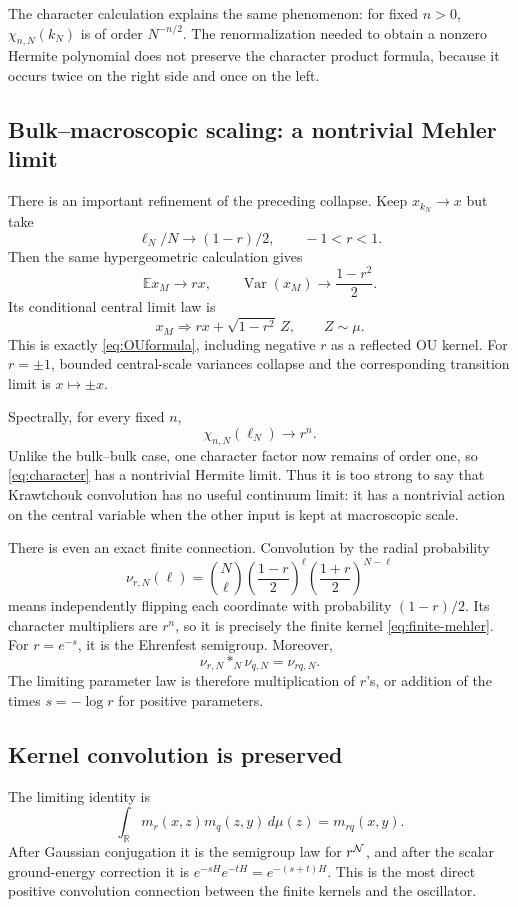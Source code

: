 \documentclass[11pt,reqno]{amsart}
\theoremstyle{remark}\newtheorem{remark}[proposition]{Remark}
\newcommand{\R}{\mathbb R}\newcommand{\F}{\mathcal F}
\begin{document}
The character calculation explains the same phenomenon: for fixed
$n>0$, $\chi_{n,N}(k_N)$ is of order $N^{-n/2}$. The renormalization
needed to obtain a nonzero Hermite polynomial does not preserve the
character product formula, because it occurs twice on the right side
and once on the left.

\subsection{Bulk--macroscopic scaling: a nontrivial Mehler limit}\label{sec:mixed}
There is an important refinement of the preceding collapse. Keep
$x_{k_N}\to x$ but take
\[
 \ell_N/N\longrightarrow(1-r)/2,\qquad -1<r<1.
\]
Then the same hypergeometric calculation gives
\[
 \mathbb E x_M\longrightarrow rx,\qquad
 \operatorname{Var}(x_M)\longrightarrow\frac{1-r^2}{2}.
\]
Its conditional central limit law is
\begin{equation}\label{eq:mixed}
 x_M\Longrightarrow rx+\sqrt{1-r^2}\,Z,\qquad Z\sim\mu.
\end{equation}
This is exactly \eqref{eq:OUformula}, including negative $r$ as a reflected
OU kernel. For $r=\pm1$, bounded central-scale variances collapse and the
corresponding transition limit is $x\mapsto\pm x$.

Spectrally, for every fixed $n$,
\[
 \chi_{n,N}(\ell_N)\longrightarrow r^n.
\]
Unlike the bulk--bulk case, one character factor now remains of order
one, so \eqref{eq:character} has a nontrivial Hermite limit.
Thus it is too strong to say that Krawtchouk convolution has no useful
continuum limit: it has a nontrivial action on the central variable
when the other input is kept at macroscopic scale.

There is even an exact finite connection. Convolution by the radial
probability
\[
 \nu_{r,N}(\ell)=\binom N\ell
 \left(\frac{1-r}{2}\right)^\ell
 \left(\frac{1+r}{2}\right)^{N-\ell}
\]
means independently flipping each coordinate with probability
$(1-r)/2$. Its character multipliers are $r^n$, so it is precisely the
finite kernel \eqref{eq:finite-mehler}. For $r=e^{-s}$, it is the
Ehrenfest semigroup. Moreover,
\[
 \nu_{r,N}*_N\nu_{q,N}=\nu_{rq,N}.
\]
The limiting parameter law is therefore multiplication of $r$'s, or
addition of the times $s=-\log r$ for positive parameters.

\subsection{Kernel convolution is preserved}
The limiting identity is
\begin{equation}\label{eq:kernel-compose}
 \int_\R m_r(x,z)m_q(z,y)\,d\mu(z)=m_{rq}(x,y).
\end{equation}
After Gaussian conjugation it is the semigroup law for $r^{\mathcal N}$,
and after the scalar ground-energy correction it is
$e^{-sH}e^{-tH}=e^{-(s+t)H}$.
This is the most direct positive convolution connection between the
finite kernels and the oscillator.
\end{document}
